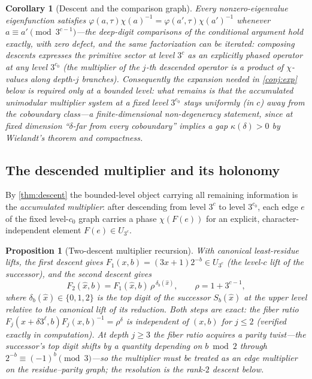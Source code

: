 \documentclass[11pt]{article}
\theoremstyle{plain}
\newtheorem{proposition}{Proposition}
\newtheorem{corollary}{Corollary}
\theoremstyle{definition}
\theoremstyle{remark}
\begin{document}
\begin{corollary}[Descent and the comparison graph]\label{cor:descentcomp}
Every nonzero-eigenvalue eigenfunction satisfies
$\varphi(a,\tau)\chi(a)^{-1}=\varphi(a',\tau)\chi(a')^{-1}$ whenever
$a\equiv a'\pmod{3^{c-1}}$---the deep-digit comparisons of the conditional
argument hold \emph{exactly}, with zero defect, and the same factorization can
be iterated: composing descents expresses the primitive sector at level $3^c$
as an explicitly phased operator at any level $3^{c_0}$ (the multiplier of the
$j$-th descended operator is a product of $\chi$-values along depth-$j$
branches). Consequently the expansion needed in \cref{conj:exp} below is
required only at a \emph{bounded} level: what remains is that the accumulated
unimodular multiplier system at a fixed level $3^{c_0}$ stays uniformly (in
$c$) away from the coboundary class---a finite-dimensional non-degeneracy
statement, since at fixed dimension ``$\delta$-far from every coboundary''
implies a gap $\kappa(\delta)>0$ by Wielandt's theorem and compactness.
\end{corollary}

\subsection*{The descended multiplier and its holonomy}

By \cref{thm:descent} the bounded-level object carrying all remaining
information is the \emph{accumulated multiplier}: after descending from level
$3^c$ to level $3^{c_0}$, each edge $e$ of the fixed level-$c_0$ graph carries a
phase $\chi(F(e))$ for an explicit, character-independent element
$F(e)\in U_{3^c}$.

\begin{proposition}[Two-descent multiplier recursion]\label{prop:multrec}
With canonical least-residue lifts, the first descent gives
$F_1(x,b)=(3x+1)2^{-b}\in U_{3^c}$ (the level-$c$ lift of the successor), and
the second descent gives
\[
F_2(\hat x,b)=F_1(\hat x,b)\,\rho^{\,\delta_b(\hat x)},\qquad
\rho=1+3^{c-1},
\]
where $\delta_b(\hat x)\in\{0,1,2\}$ is the top digit of the successor
$S_b(\hat x)$ at the upper level relative to the canonical lift of its
reduction. Both steps are exact: the fiber ratio
$F_j(x+\delta3^{\ell},b)F_j(x,b)^{-1}=\rho^{\delta}$ is independent of $(x,b)$
for $j\le2$ (verified exactly in computation). At depth $j\ge3$ the fiber ratio
acquires a parity twist---the successor's top digit shifts by a quantity
depending on $b\bmod2$ through $2^{-b}\equiv(-1)^b\pmod3$---so the multiplier
must be treated as an edge multiplier on the residue--parity graph; the
resolution is the rank-$2$ descent below.
\end{proposition}
\end{document}
